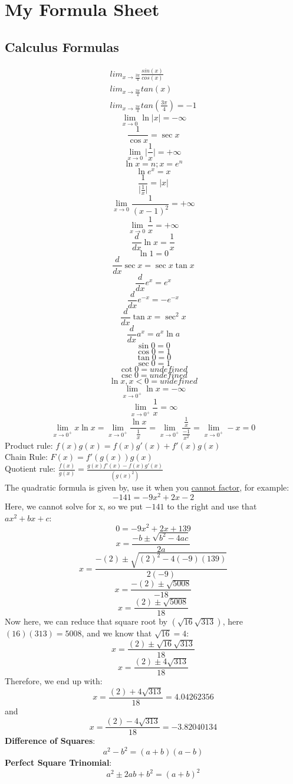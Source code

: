 \documentclass{article}
\begin{document}
\section*{My Formula Sheet}

\subsection*{Calculus Formulas}
\begin{align}
   lim_{x \to \frac{3\pi}{4}} \frac{sin(x)}{cos(x)}\\
   lim_{x \to \frac{3\pi}{4}} tan(x)\\
   lim_{x \to \frac{3\pi}{4}} tan(\frac{3\pi}{4}) = -1
\end{align}
\[\lim_{x \to 0} \ln{ \lvert x \rvert} = -\infty \]
\[\frac{1}{\cos{x}} = \sec{x}\]
\[\lim_{x \to 0} \lvert \frac{1}{x} \rvert = +\infty \] 
\[\ln{x}=n; x = e^{n}\]
\[\ln{e^x}=x\]
\[\frac{1}{\lvert \frac{1}{x} \rvert} = \lvert x \rvert\]
\[\lim_{x \to 0}\frac{1}{(x-1)^2}=+\infty\]
\[\lim_{x \to 0}\frac{1}{x}=+\infty\]
\[\frac{d}{dx} \ln{x} = \frac{1}{x}\]
\[\ln{1} = 0\]
\[\frac{d}{dx} \sec{x} = \sec{x} \tan{x}\]
\[\frac{d}{dx} e^x = e^x\]
\[\frac{d}{dx} e^{-x} = -e^{-x}\]
\[\frac{d}{dx} \tan{x} = \sec^2{x}\]
\[\frac{d}{dx} a^x = a^x \ln{a}\]
\[\sin{0} = 0\]
\[\cos{0} = 1\]
\[\tan{0} = 0\]
\[\sec{0} = 1\]
\[\cot{0} = undefined\]
\[\csc{0} = undefined\]
\[\ln{x}, x<0 = undefined\]
\[\lim_{x \to 0^+} \ln{x} = -\infty\]
\[\lim_{x \to 0^+} \frac{1}{x} = \infty\]
\[\lim_{x \to 0^+} x \ln{x} = \lim_{x \to 0^+} \frac{\ln{x}}{\frac{1}{x}} = \lim_{x \to 0^+} \frac{\frac{1}{x}}{\frac{-1}{x^2}} = \lim_{x \to 0^+} -x = 0\]
Product rule: \(f(x)g(x) = f(x)g'(x)+f'(x)g(x)\)\\
\newline
Chain Rule: \(F(x)=f'(g(x))g(x)\)\\
\newline
Quotient rule: \(\frac{f(x)}{g(x)} = \frac{g(x)f'(x)-f(x)g'(x)}{(g(x)^2)}\)\\
\newline
The quadratic formula is given by, use it when you \underline{cannot factor}, for example:
\[-141 = -9x^2+2x-2\]
Here, we cannot solve for x, so we put \(-141\) to the right and use that \(ax^2+bx+c\):
\[0 = -9x^2+2x+139\]
\[ x = \frac{-b \pm \sqrt{b^2 - 4ac}}{2a} \]
\[ x = \frac{-(2) \pm \sqrt{(2)^2 - 4(-9)(139)}}{2(-9)} \]
\[ x = \frac{-(2) \pm \sqrt{5008}}{-18} \]
\[ x = \frac{(2) \pm \sqrt{5008}}{18} \]
Now here, we can reduce that square root by \((\sqrt{16} \sqrt{313})\), here \((16)(313) = 5008\), and we know that \(\sqrt{16} = 4\):
\[ x = \frac{(2) \pm \sqrt{16} \sqrt{313}}{18} \]
\[ x = \frac{(2) \pm 4 \sqrt{313}}{18} \]
Therefore, we end up with:
\[ x = \frac{(2) + 4 \sqrt{313}}{18} = 4.04262356\]
and
\[ x = \frac{(2) - 4 \sqrt{313}}{18} = -3.82040134\]
\textbf{Difference of Squares}:
\[a^2-b^2 = (a+b)(a-b)\]
\textbf{Perfect Square Trinomial}: 
\[a^2 \pm 2ab + b^2 = (a+b)^2\]
\end{document}
